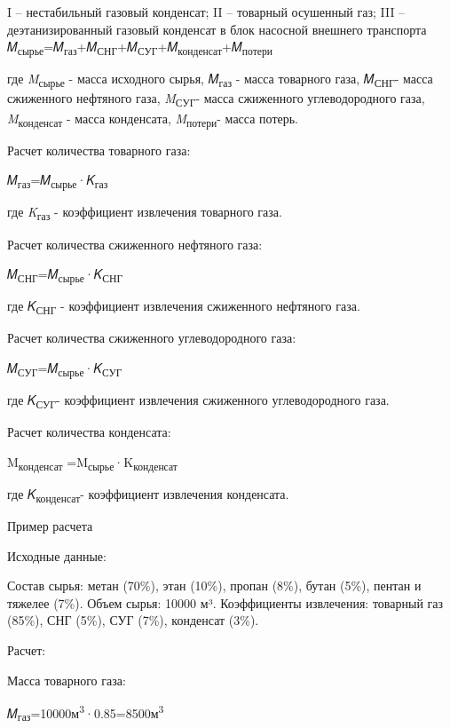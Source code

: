 \begin{multicols}{2}
{\small I -- нестабильный газовый конденсат; II -- товарный осушенный газ; III -- деэтанизированный газовый конденсат в блок насосной внешнего транспорта
𝑀\textsubscript{сырье}=𝑀\textsubscript{газ}+𝑀\textsubscript{СНГ}+𝑀\textsubscript{СУГ}+𝑀\textsubscript{конденсат}+𝑀\textsubscript{потери}

где \emph{M}\textsubscript{сырье} - масса исходного сырья,
𝑀\textsubscript{газ} - масса товарного газа, 𝑀\textsubscript{СНГ}- масса
сжиженного нефтяного газа, \emph{M}\textsubscript{СУГ}- масса сжиженного
углеводородного газа, \emph{M}\textsubscript{конденсат} - масса
конденсата, \emph{M}\textsubscript{потери}- масса потерь.

Расчет количества товарного газа:

𝑀\textsubscript{газ}=𝑀\textsubscript{сырье}·𝐾\textsubscript{газ}

\hspace{0pt}где \emph{K}\textsubscript{газ} - коэффициент извлечения
товарного газа.

Расчет количества сжиженного нефтяного газа:

𝑀\textsubscript{СНГ}=𝑀\textsubscript{сырье}·𝐾\textsubscript{СНГ}

\hspace{0pt}где 𝐾\textsubscript{СНГ} - коэффициент извлечения сжиженного
нефтяного газа.

Расчет количества сжиженного углеводородного газа:

𝑀\textsubscript{СУГ}=𝑀\textsubscript{сырье}·𝐾\textsubscript{СУГ}

\hspace{0pt}где 𝐾\textsubscript{СУГ}- коэффициент извлечения сжиженного
углеводородного газа.

Расчет количества конденсата:

M\textsubscript{конденсат}
=M\textsubscript{сырье}·K\textsubscript{конденсат}

где 𝐾\textsubscript{конденсат}- коэффициент извлечения конденсата.

Пример расчета

Исходные данные:

Состав сырья: метан (70\%), этан (10\%), пропан (8\%), бутан (5\%),
пентан и тяжелее (7\%). Объем сырья: 10000 м³. Коэффициенты извлечения:
товарный газ (85\%), СНГ (5\%), СУГ (7\%), конденсат (3\%).

Расчет:

Масса товарного газа:

𝑀\textsubscript{газ}=10000м\textsuperscript{3}·0.85=8500м\textsuperscript{3}

}
\end{multicols}
